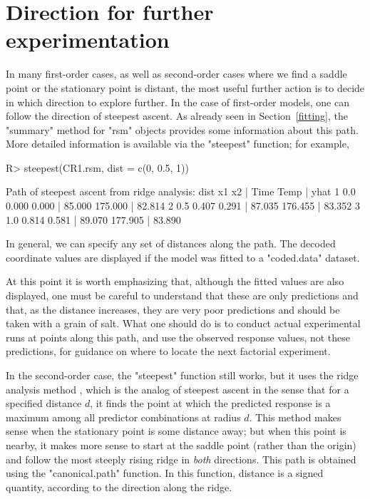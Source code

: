 \documentclass[article,nojss]{jss}
\def\Sect#1{Section~\ref{#1}}
\begin{document}
\section{Direction for further experimentation}\label{steepest}
In many first-order cases, as well as second-order cases where we find a saddle point or the stationary point is distant, the most useful further action is to decide in which direction to explore further.  In the case of first-order models, one can follow the direction of steepest ascent.  As already seen in \Sect{fitting}, the "summary" method for "rsm" objects provides some information about this path.  More detailed information is available via the "steepest" function; for example,
\begin{Schunk}
\begin{Sinput}
R> steepest(CR1.rsm, dist = c(0, 0.5, 1))
\end{Sinput}
\begin{Soutput}
Path of steepest ascent from ridge analysis:
  dist    x1    x2 |   Time    Temp |   yhat
1  0.0 0.000 0.000 | 85.000 175.000 | 82.814
2  0.5 0.407 0.291 | 87.035 176.455 | 83.352
3  1.0 0.814 0.581 | 89.070 177.905 | 83.890
\end{Soutput}
\end{Schunk}
In general, we can specify any set of distances along the path.  The  decoded coordinate values are displayed if the model was fitted to a "coded.data" dataset.  

At this point it is worth emphasizing that, although the fitted values are also displayed, one must be careful to understand that these are only predictions and that, as the distance increases, they are very poor predictions and should be taken with a grain of salt.  What one should do is to conduct actual experimental runs at points along this path, and use the observed response values, not these predictions, for guidance on where to locate the next factorial experiment.

In the second-order case, the "steepest" function still works, but it uses the ridge analysis method \cite[]{Hoe59,Dra63}, which is the analog of steepest ascent in the sense that for a specified distance $d$, it finds the point at which the predicted response is a maximum among all predictor combinations at radius $d$.  This method makes sense when the stationary point is some distance away; but when this point is nearby, it makes more sense to start at the saddle point (rather than the origin) and follow the most steeply rising ridge in \emph{both} directions.  This path is obtained using the "canonical.path" function.  In this function, distance is a signed quantity, according to the direction along the ridge.
\end{document}

